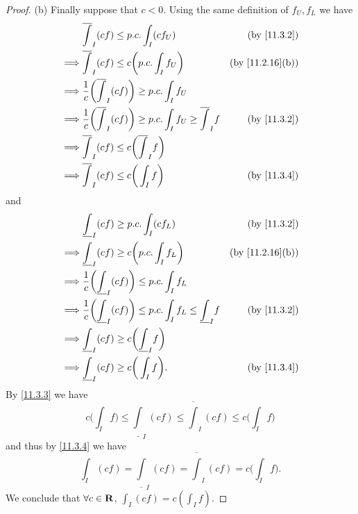 \begin{proof}{(b)}
  Finally suppose that \(c < 0\).
  Using the same definition of \(f_U, f_L\) we have
  \begin{align*}
             & \overline{\int}_I (cf) \leq p.c. \int_I (c f_U)                                              & \text{(by \cref{11.3.2})}     \\
    \implies & \overline{\int}_I (cf) \leq c \bigg(p.c. \int_I f_U\bigg)                                    & \text{(by \cref{11.2.16}(b))} \\
    \implies & \frac{1}{c} \bigg(\overline{\int}_I (cf)\bigg) \geq p.c. \int_I f_U                                                          \\
    \implies & \frac{1}{c} \bigg(\overline{\int}_I (cf)\bigg) \geq p.c. \int_I f_U \geq \overline{\int}_I f & \text{(by \cref{11.3.2})}     \\
    \implies & \overline{\int}_I (cf) \leq c\bigg(\overline{\int}_I f\bigg)                                                                 \\
    \implies & \overline{\int}_I (cf) \leq c\bigg(\int_I f\bigg)                                            & \text{(by \cref{11.3.4})}
  \end{align*}
  and
  \begin{align*}
             & \underline{\int}_I (cf) \geq p.c. \int_I (c f_L)                                               & \text{(by \cref{11.3.2})}     \\
    \implies & \underline{\int}_I (cf) \geq c \bigg(p.c. \int_I f_L\bigg)                                     & \text{(by \cref{11.2.16}(b))} \\
    \implies & \frac{1}{c} \bigg(\underline{\int}_I (cf)\bigg) \leq p.c. \int_I f_L                                                           \\
    \implies & \frac{1}{c} \bigg(\underline{\int}_I (cf)\bigg) \leq p.c. \int_I f_L \leq \underline{\int}_I f & \text{(by \cref{11.3.2})}     \\
    \implies & \underline{\int}_I (cf) \geq c\bigg(\underline{\int}_I f\bigg)                                                                 \\
    \implies & \underline{\int}_I (cf) \geq c\bigg(\int_I f\bigg).                                            & \text{(by \cref{11.3.4})}
  \end{align*}
  By \cref{11.3.3} we have
  \[
    c\bigg(\int_I f\bigg) \leq \underline{\int}_I (cf) \leq \overline{\int}_I (cf) \leq c\bigg(\int_I f\bigg)
  \]
  and thus by \cref{11.3.4} we have
  \[
    \int_I (cf) = \underline{\int}_I (cf) = \overline{\int}_I (cf) = c\bigg(\int_I f\bigg).
  \]
  We conclude that \(\forall c \in \mathbf{R}\), \(\int_I (cf) = c (\int_I f)\).
\end{proof}

